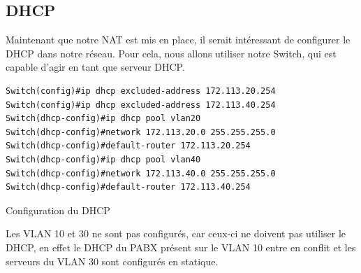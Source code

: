 \documentclass{article}
\begin{document}
\subsection{DHCP}
Maintenant que notre NAT est mis en place, il serait intéressant de configurer le DHCP dans notre réseau.
Pour cela, nous allons utiliser notre Switch, qui est capable d'agir en tant que serveur DHCP.
\begin{listing}[H]
    \begin{verbatim}
Switch(config)#ip dhcp excluded-address 172.113.20.254
Switch(config)#ip dhcp excluded-address 172.113.40.254
Switch(dhcp-config)#ip dhcp pool vlan20
Switch(dhcp-config)#network 172.113.20.0 255.255.255.0
Switch(dhcp-config)#default-router 172.113.20.254
Switch(dhcp-config)#ip dhcp pool vlan40
Switch(dhcp-config)#network 172.113.40.0 255.255.255.0
Switch(dhcp-config)#default-router 172.113.40.254
    \end{verbatim}
    \caption{Configuration du DHCP}
    \label{switch:dhcp}
\end{listing}
Les VLAN 10 et 30 ne sont pas configurés, car ceux-ci ne doivent pas utiliser le DHCP, en effet le DHCP du PABX présent sur le VLAN 10 entre en conflit et les serveurs du VLAN 30 sont configurés en statique.
\end{document}
